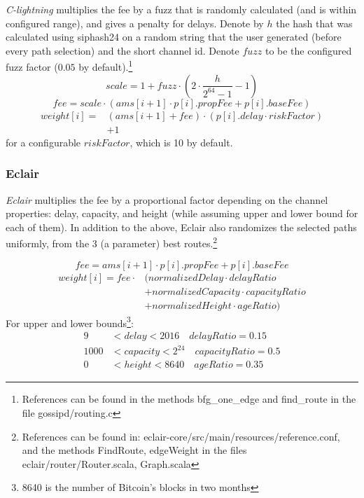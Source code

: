 \emph{C-lightning} multiplies 
the fee by a fuzz that is 
randomly calculated (and is within configured range), and gives a
penalty for delays.
Denote by $h$ the hash that was calculated using siphash24 
on a random string that the user generated (before every path selection) and the short channel id. Denote $fuzz$ to be the configured fuzz factor ($0.05$ by default).\footnote{References can be found in the methods bfg\_one\_edge and find\_route in the file gossipd/routing.c}
$$ scale = 1 + fuzz \cdot (2 \cdot \frac{h}{2^{64}-1} - 1) $$
$$ fee = scale \cdot (ams[i+1] \cdot p[i].propFee + p[i].baseFee) $$
\begin{align*}
    weight[i] = &(ams[i+1] + fee) \cdot (p[i].delay \cdot riskFactor) \\
                &+ 1
\end{align*}
for a configurable $riskFactor$, which is 10 by default.

\subsubsection{Eclair} \label{subsubsec::imp_eclair}

\emph{Eclair} multiplies 
the fee by a proportional factor depending on the channel properties: 
delay, capacity, and height (while assuming upper and lower bound for each of them).
In addition to the above, Eclair also randomizes 
the selected paths uniformly, from the 3 (a parameter) best routes.\footnote{References can be found in: eclair-core/src/main/resources/reference.conf, and the methods FindRoute, edgeWeight in the files eclair/router/Router.scala, Graph.scala}

$$ fee = ams[i+1] \cdot p[i].propFee + p[i].baseFee $$
\begin{align*}
 weight[i] = fee \cdot &(normalizedDelay \cdot delayRatio \\
 &+ normalizedCapacity \cdot capacityRatio \\
 &+ normalizedHeight \cdot ageRatio) 
\end{align*}
For upper and lower bounds\footnote{8640 is the number of Bitcoin's blocks in two months}: 
\begin{align*}
    9 &< delay < \num{2016} \quad delayRatio = 0.15 \\
    \num{1000} &< capacity < 2 ^{24} \quad capacityRatio = 0.5 \\
    0 &< height < \num{8640} \quad ageRatio = 0.35
\end{align*}

